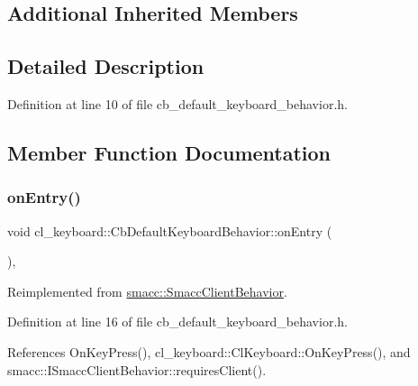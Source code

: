 \subsection*{Additional Inherited Members}


\subsection{Detailed Description}


Definition at line 10 of file cb\+\_\+default\+\_\+keyboard\+\_\+behavior.\+h.



\subsection{Member Function Documentation}
\mbox{\label{classcl__keyboard_1_1CbDefaultKeyboardBehavior_a06e49d8c78aeffecf74c27b05f529a3a}} 
\subsubsection{\texorpdfstring{on\+Entry()}{onEntry()}}
{\footnotesize\ttfamily void cl\+\_\+keyboard\+::\+Cb\+Default\+Keyboard\+Behavior\+::on\+Entry (\begin{DoxyParamCaption}{ }\end{DoxyParamCaption})\hspace{0.3cm}{\ttfamily [inline]}, {\ttfamily [virtual]}}



Reimplemented from \hyperlink{classsmacc_1_1SmaccClientBehavior_ad5d3e1f1697c3cfe66c94cadba948493}{smacc\+::\+Smacc\+Client\+Behavior}.



Definition at line 16 of file cb\+\_\+default\+\_\+keyboard\+\_\+behavior.\+h.



References On\+Key\+Press(), cl\+\_\+keyboard\+::\+Cl\+Keyboard\+::\+On\+Key\+Press(), and smacc\+::\+I\+Smacc\+Client\+Behavior\+::requires\+Client().


